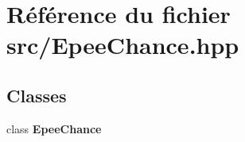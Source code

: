 \section{Référence du fichier src/\-Epee\-Chance.hpp}
\label{_epee_chance_8hpp}
\subsection*{Classes}
\begin{DoxyCompactItemize}
\item 
class {\bf Epee\-Chance}
\end{DoxyCompactItemize}
